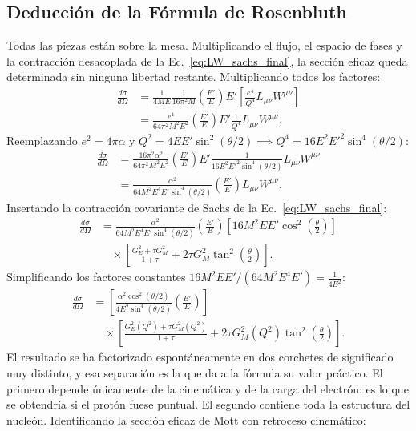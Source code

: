 \documentclass[10pt,a4paper]{article}
\begin{document}
\subsection{Deducción de la Fórmula de Rosenbluth}
Todas las piezas están sobre la mesa. Multiplicando el flujo, el espacio de fases y la contracción desacoplada de la Ec.~\eqref{eq:LW_sachs_final}, la sección eficaz queda determinada sin ninguna libertad restante. Multiplicando todos los factores:
\begin{align}
\frac{d\sigma}{d\Omega} &= \frac{1}{4 M E} \frac{1}{16\pi^2 M} \left(\frac{E'}{E}\right) E' \left[ \frac{e^4}{Q^4} L_{\mu\nu} W^{\mu\nu} \right] \nonumber \\
&= \frac{e^4}{64 \pi^2 M^2 E^2} \left(\frac{E'}{E}\right) E' \frac{1}{Q^4} L_{\mu\nu} W^{\mu\nu}.
\end{align}
Reemplazando $e^2 = 4\pi\alpha$ y $Q^2 = 4 E E' \sin^2(\theta/2) \implies Q^4 = 16 E^2 E'^2 \sin^4(\theta/2)$:
\begin{align}
\frac{d\sigma}{d\Omega} &= \frac{16 \pi^2 \alpha^2}{64 \pi^2 M^2 E^2} \left(\frac{E'}{E}\right) E' \frac{1}{16 E^2 E'^2 \sin^4(\theta/2)} L_{\mu\nu} W^{\mu\nu} \nonumber \\
&= \frac{\alpha^2}{64 M^2 E^4 E' \sin^4(\theta/2)} \left(\frac{E'}{E}\right) L_{\mu\nu} W^{\mu\nu}.
\end{align}
Insertando la contracción covariante de Sachs de la Ec.~\eqref{eq:LW_sachs_final}:
\begin{align}
\frac{d\sigma}{d\Omega} &= \frac{\alpha^2}{64 M^2 E^4 E' \sin^4(\theta/2)} \left(\frac{E'}{E}\right) \left[ 16 M^2 E E' \cos^2\left(\frac{\theta}{2}\right) \right] \nonumber \\
&\quad \times \left[ \frac{G_E^2 + \tau G_M^2}{1 + \tau} + 2\tau G_M^2 \tan^2\left(\frac{\theta}{2}\right) \right].
\end{align}
Simplificando los factores constantes $16 M^2 E E' / (64 M^2 E^4 E') = \frac{1}{4 E^2}$:
\begin{align}
\frac{d\sigma}{d\Omega} &= \left[ \frac{\alpha^2 \cos^2(\theta/2)}{4 E^2 \sin^4(\theta/2)} \left(\frac{E'}{E}\right) \right] \nonumber \\
&\quad \times \left[ \frac{G_E^2(Q^2) + \tau G_M^2(Q^2)}{1+\tau} + 2\tau G_M^2(Q^2) \tan^2\left(\frac{\theta}{2}\right) \right].
\end{align}
El resultado se ha factorizado espontáneamente en dos corchetes de significado muy distinto, y esa separación es la que da a la fórmula su valor práctico. El primero depende únicamente de la cinemática y de la carga del electrón: es lo que se obtendría si el protón fuese puntual. El segundo contiene toda la estructura del nucleón. Identificando la sección eficaz de Mott con retroceso cinemático:
\end{document}
